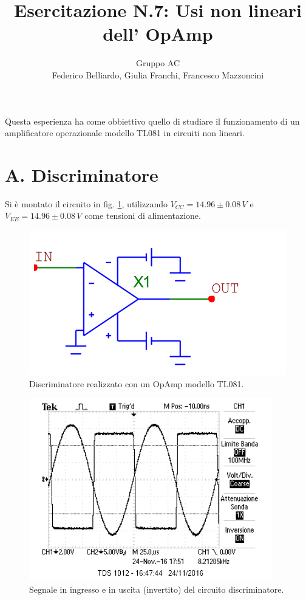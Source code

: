 \documentclass[10pt,a4paper]{article}
\author{Gruppo AC \\ Federico Belliardo, Giulia Franchi, Francesco Mazzoncini}
\title{Esercitazione N.7: Usi non lineari dell’ OpAmp}
\begin{document}
\maketitle
Questa esperienza ha come obbiettivo quello di studiare il funzionamento di un amplificatore operazionale modello TL081 in circuiti non lineari.

\section*{A. Discriminatore}

Si è montato il circuito in fig. \ref{circuito1}, utilizzando $V_{CC} = 14.96\pm0.08 \, V$ e $V_{EE} = 14.96 \pm 0.08 \, V$ come tensioni di alimentazione.

\begin{figure}[htb!]
\centering
\includegraphics[scale=0.5]{Discriminatore.png}
\caption{Discriminatore realizzato con un OpAmp modello TL081.}
\label{circuito1}
\end{figure}

\begin{figure}[htb!]
\centering
\includegraphics[scale=1.0]{immagini/discriminatore.png}
\caption{Segnale in ingresso e in uscita (invertito) del circuito discriminatore.}
\label{funzionaBene}
\end{figure}
\end{document}
